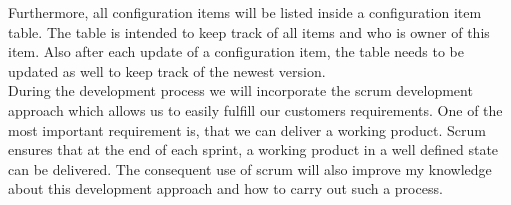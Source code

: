Furthermore, all configuration items will be listed inside a configuration item table. The table is intended to keep track of all items and who is owner of this item. Also after each update of a configuration item, the table needs to be updated as well to keep track of the newest version. \\

During the development process we will incorporate the scrum development approach which allows us to easily fulfill our customers requirements. One of the most important requirement is, that we can deliver a working product. Scrum ensures that at the end of each sprint, a working product in a well defined state can be delivered. The consequent use of scrum will also improve my knowledge about this development approach and how to carry out such a process.

